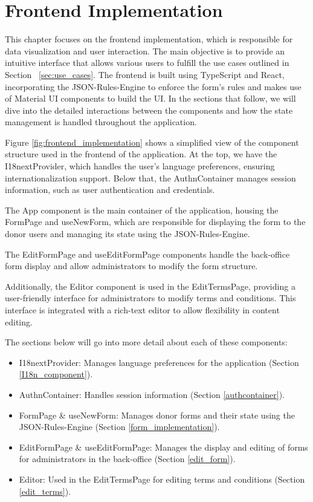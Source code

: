 %
%
\chapter{Frontend Implementation} \label{cap:frontend_implementation}

This chapter focuses on the frontend implementation, which is responsible for data visualization and user interaction. The main objective is to provide an intuitive interface that allows various users to fulfill the use cases outlined in Section ~\ref{sec:use_cases}. The frontend is built using TypeScript \cite{TypeScript} and React\cite{React}, incorporating the JSON-Rules-Engine to enforce the form's rules and makes use of Material UI \cite{Material_UI} components to build the UI. In the sections that follow, we will dive into the detailed interactions between the components and how the state management is handled throughout the application.

Figure \ref{fig:frontend_implementation} shows a simplified view of the component structure used in the frontend of the application. At the top, we have the I18nextProvider, which handles the user's language preferences, ensuring internationalization support. Below that, the AuthnContainer manages session information, such as user authentication and credentials.

The App component is the main container of the application, housing the FormPage and useNewForm, which are responsible for displaying the form to the donor users and managing its state using the JSON-Rules-Engine. 

The EditFormPage and useEditFormPage components handle the back-office form display and allow administrators to modify the form structure.

Additionally, the Editor component is used in the EditTermsPage, providing a user-friendly interface for administrators to modify terms and conditions. This interface is integrated with a rich-text editor to allow flexibility in content editing.

The sections below will go into more detail about each of these components:

\begin{itemize}
	\item I18nextProvider: Manages language preferences for the application (Section \ref{I18n_component}).
	\item AuthnContainer: Handles session information (Section \ref{authcontainer}).
	\item FormPage \& useNewForm: Manages donor forms and their state using the JSON-Rules-Engine (Section \ref{form_implementation}).
	\item EditFormPage \& useEditFormPage: Manages the display and editing of forms for administrators in the back-office (Section \ref{edit_form}).
	\item Editor: Used in the EditTermsPage for editing terms and conditions (Section \ref{edit_terms}).
\end{itemize}

